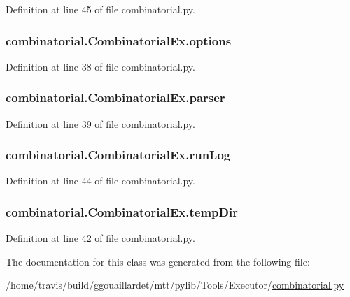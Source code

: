 Definition at line 45 of file combinatorial.\-py.

\hypertarget{classcombinatorial_1_1CombinatorialEx_a20eda525b3947495bb6084c560dcca27}{
\subsubsection[{options}]{\setlength{\rightskip}{0pt plus 5cm}combinatorial.\-Combinatorial\-Ex.\-options}}\label{classcombinatorial_1_1CombinatorialEx_a20eda525b3947495bb6084c560dcca27}


Definition at line 38 of file combinatorial.\-py.

\hypertarget{classcombinatorial_1_1CombinatorialEx_ab5c27fece8991a34f47e85870637fc91}{
\subsubsection[{parser}]{\setlength{\rightskip}{0pt plus 5cm}combinatorial.\-Combinatorial\-Ex.\-parser}}\label{classcombinatorial_1_1CombinatorialEx_ab5c27fece8991a34f47e85870637fc91}


Definition at line 39 of file combinatorial.\-py.

\hypertarget{classcombinatorial_1_1CombinatorialEx_a3de3f7da4c201525da8452258df0bc7b}{
\subsubsection[{run\-Log}]{\setlength{\rightskip}{0pt plus 5cm}combinatorial.\-Combinatorial\-Ex.\-run\-Log}}\label{classcombinatorial_1_1CombinatorialEx_a3de3f7da4c201525da8452258df0bc7b}


Definition at line 44 of file combinatorial.\-py.

\hypertarget{classcombinatorial_1_1CombinatorialEx_a24b3bc621a8380e406bade192bc371d4}{
\subsubsection[{temp\-Dir}]{\setlength{\rightskip}{0pt plus 5cm}combinatorial.\-Combinatorial\-Ex.\-temp\-Dir}}\label{classcombinatorial_1_1CombinatorialEx_a24b3bc621a8380e406bade192bc371d4}


Definition at line 42 of file combinatorial.\-py.



The documentation for this class was generated from the following file\-:\begin{DoxyCompactItemize}
\item 
/home/travis/build/ggouaillardet/mtt/pylib/\-Tools/\-Executor/\hyperlink{combinatorial_8py}{combinatorial.\-py}\end{DoxyCompactItemize}
